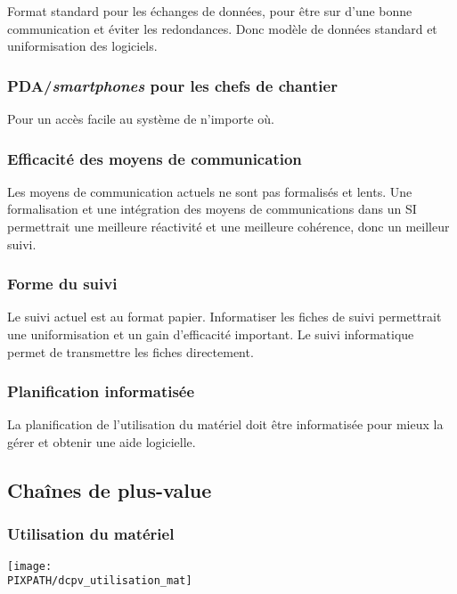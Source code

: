 \documentclass[twoside]{article}
\newcommand\PIXPATH{./docs/pics}
\begin{document}
Format standard pour les échanges de données, pour être sur
d’une bonne communication
et éviter les redondances. Donc modèle de données standard
et uniformisation des logiciels.

\subsubsection{PDA/{\sl smartphones} pour les chefs de chantier}

Pour un accès facile au système de n’importe où.

\subsubsection{Efficacité des moyens de communication}

Les moyens de communication actuels ne sont pas formalisés et lents. 
Une formalisation et une intégration des moyens de communications dans un
SI permettrait une meilleure réactivité et une meilleure cohérence, donc
un meilleur suivi.

\subsubsection{Forme du suivi}

Le suivi actuel est au format papier. Informatiser les fiches de suivi
permettrait une uniformisation et un gain d’efficacité important. Le suivi
informatique permet de transmettre les fiches directement.

\subsubsection{Planification informatisée}
La planification de l’utilisation du matériel doit être informatisée pour
mieux la gérer et obtenir une aide logicielle.




\subsection{Chaînes de plus-value}

\subsubsection{Utilisation du matériel}
\begin{center}
    \texttt{[image: \\PIXPATH/dcpv\_utilisation\_mat]}
\end{center}
\end{document}
